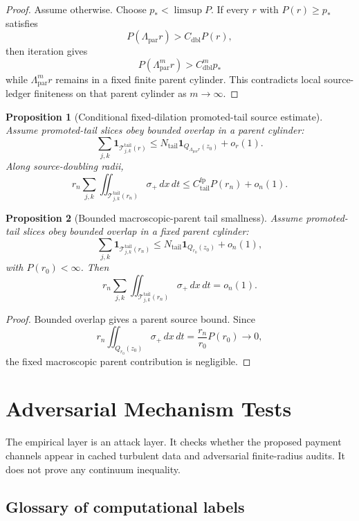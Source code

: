 \documentclass[11pt]{article}
\newtheorem{proposition}{Proposition}
\begin{document}
\begin{proof}
Assume otherwise.  Choose \(p_*<\limsup P\).  If every \(r\) with
\(P(r)\ge p_*\) satisfies
\[
P(\Lambda_{\mathrm{par}}r)>C_{\mathrm{dbl}}P(r),
\]
then iteration gives
\[
P(\Lambda_{\mathrm{par}}^m r)>C_{\mathrm{dbl}}^m p_*
\]
while \(\Lambda_{\mathrm{par}}^m r\) remains in a fixed finite parent
cylinder.  This contradicts local source-ledger finiteness on that parent
cylinder as \(m\to\infty\).
\end{proof}

\begin{proposition}[Conditional fixed-dilation promoted-tail source estimate]
\label{prop:fixed-tail}
Assume promoted-tail slices obey bounded overlap in a parent cylinder:
\[
\sum_{j,k}\mathbf 1_{\mathcal T_{j,k}^{\mathrm{tail}}(r)}
\le
N_{\mathrm{tail}}\mathbf 1_{Q_{\Lambda_{\mathrm{par}}r}(z_0)}+o_r(1).
\]
Along source-doubling radii,
\[
r_n\sum_{j,k}\iint_{\mathcal T_{j,k}^{\mathrm{tail}}(r_n)}
\sigma_+\,dx\,dt
\le
C_{\mathrm{tail}}^{\mathrm{fp}}P(r_n)+o_n(1).
\]
\end{proposition}

\begin{proposition}[Bounded macroscopic-parent tail smallness]
\label{prop:macro-tail}
Assume promoted-tail slices obey bounded overlap in a fixed parent cylinder:
\[
\sum_{j,k}\mathbf 1_{\mathcal T_{j,k}^{\mathrm{tail}}(r_n)}
\le
N_{\mathrm{tail}}\mathbf 1_{Q_{r_0}(z_0)}+o_n(1),
\]
with \(P(r_0)<\infty\).  Then
\[
r_n\sum_{j,k}\iint_{\mathcal T_{j,k}^{\mathrm{tail}}(r_n)}
\sigma_+\,dx\,dt=o_n(1).
\]
\end{proposition}

\begin{proof}
Bounded overlap gives a parent source bound.  Since
\[
r_n\iint_{Q_{r_0}(z_0)}\sigma_+\,dx\,dt
=\frac{r_n}{r_0}P(r_0)\to0,
\]
the fixed macroscopic parent contribution is negligible.
\end{proof}

\clearpage
\section{Adversarial Mechanism Tests}
\label{sec:tests}

The empirical layer is an attack layer.  It checks whether the proposed
payment channels appear in cached turbulent data and adversarial finite-radius
audits.  It
does not prove any continuum inequality.

\subsection*{Glossary of computational labels}
\end{document}
